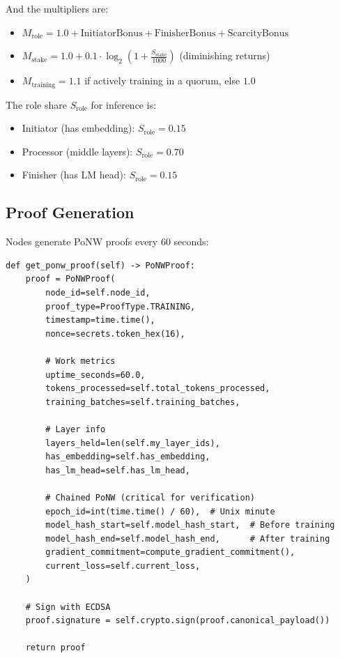 \documentclass[11pt,a4paper]{article}
\begin{document}
And the multipliers are:
\begin{itemize}
    \item $M_{\text{role}} = 1.0 + \text{InitiatorBonus} + \text{FinisherBonus} + \text{ScarcityBonus}$
    \item $M_{\text{stake}} = 1.0 + 0.1 \cdot \log_2\left(1 + \frac{S_{\text{stake}}}{1000}\right)$ (diminishing returns)
    \item $M_{\text{training}} = 1.1$ if actively training in a quorum, else $1.0$
\end{itemize}

The role share $S_{\text{role}}$ for inference is:
\begin{itemize}
    \item Initiator (has embedding): $S_{\text{role}} = 0.15$
    \item Processor (middle layers): $S_{\text{role}} = 0.70$
    \item Finisher (has LM head): $S_{\text{role}} = 0.15$
\end{itemize}

\subsection{Proof Generation}

Nodes generate PoNW proofs every 60 seconds:

\begin{lstlisting}[caption=PoNW Proof Generation (v0.2.34+ with Chained PoNW)]
def get_ponw_proof(self) -> PoNWProof:
    proof = PoNWProof(
        node_id=self.node_id,
        proof_type=ProofType.TRAINING,
        timestamp=time.time(),
        nonce=secrets.token_hex(16),
        
        # Work metrics
        uptime_seconds=60.0,
        tokens_processed=self.total_tokens_processed,
        training_batches=self.training_batches,
        
        # Layer info
        layers_held=len(self.my_layer_ids),
        has_embedding=self.has_embedding,
        has_lm_head=self.has_lm_head,
        
        # Chained PoNW (critical for verification)
        epoch_id=int(time.time() / 60),  # Unix minute
        model_hash_start=self.model_hash_start,  # Before training
        model_hash_end=self.model_hash_end,      # After training
        gradient_commitment=compute_gradient_commitment(),
        current_loss=self.current_loss,
    )
    
    # Sign with ECDSA
    proof.signature = self.crypto.sign(proof.canonical_payload())
    
    return proof
\end{lstlisting}
\end{document}
